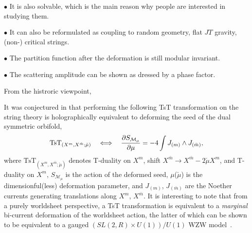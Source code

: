 \documentclass[11pt,a4paper]{article}
\begin{document}
$\bullet$ It is also solvable, which is the main reason why people are interested in studying them. 

$\bullet$ It can also be reformulated as coupling to random geometry, flat $JT$ gravity, (non-) critical strings. 

$\bullet$ The partition function after the deformation is still modular invariant. 

$\bullet$ The scattering amplitude can be shown as dressed by a phase factor. 

From the histroric viewpoint, 



It was conjectured in \cite{Apolo:2019zai} that performing the following TsT transformation on the string theory is holographically equivalent to deforming the seed of the dual symmetric orbifold,
\begin{equation}
\textrm{TsT}_{(X^m,X^{\bar m};\check\mu)} \quad\Longleftrightarrow\quad  \frac{\partial S_{\mathcal M_\mu}}{\partial \mu} = -4 \int J_{(m)} \wedge J_{(\bar{m})}, \label{conjecture}
\end{equation}
where $\textrm{TsT}_{(X^m,X^{\bar m};\check\mu)}$ denotes T-duality on  $X^m$, shift $ X^{\bar m} \to X^{\bar m} - 2\check\mu X^m$,  and T-duality on $ X^m$, $S_{\mathcal M_\mu}$ is the action of the deformed seed, $\mu$($\check\mu$) is the dimensionful(less) deformation parameter, and $J_{(m)}$, $J_{(\bar{m})}$ are the Noether currents generating translations along $X^m$, $X^{\bar m}$. It is interesting to note that from a purely worldsheet perspective, a TsT transformation is equivalent to a \emph{marginal} bi-current deformation of the worldsheet action, the latter of which can be shown to be equivalent to a gauged $(SL(2,R) \times U(1))/ U(1)$ WZW model~\cite{Apolo:2019zai}.



\pagebreak
 

\end{document}
